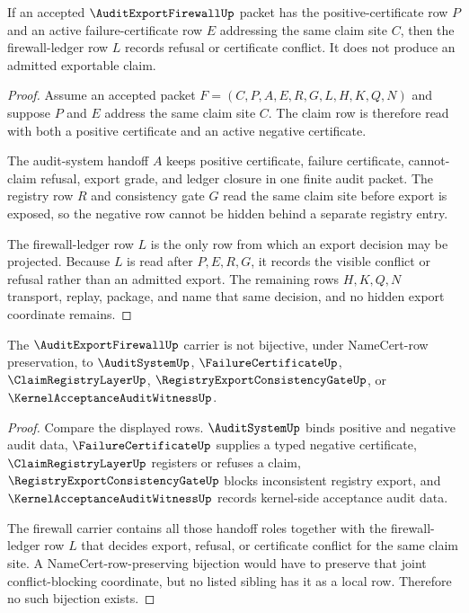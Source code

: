 \begin{theorem}
\label{thm:audit-export-firewall-nonescape}
If an accepted $\AuditExportFirewallUp$ packet has the positive-certificate row $P$ and an active failure-certificate row $E$ addressing the same claim site $C$, then the firewall-ledger row $L$ records refusal or certificate conflict. It does not produce an admitted exportable claim.
\end{theorem}
\begin{proof}
Assume an accepted packet $F=(C,P,A,E,R,G,L,H,K,Q,N)$ and suppose $P$ and $E$ address the same claim site $C$. The claim row is therefore read with both a positive certificate and an active negative certificate.

The audit-system handoff $A$ keeps positive certificate, failure certificate, cannot-claim refusal, export grade, and ledger closure in one finite audit packet. The registry row $R$ and consistency gate $G$ read the same claim site before export is exposed, so the negative row cannot be hidden behind a separate registry entry.

The firewall-ledger row $L$ is the only row from which an export decision may be projected. Because $L$ is read after $P,E,R,G$, it records the visible conflict or refusal rather than an admitted export. The remaining rows $H,K,Q,N$ transport, replay, package, and name that same decision, and no hidden export coordinate remains.
\end{proof}

\begin{theorem}
\label{thm:audit-export-firewall-sibling-independence}
The $\AuditExportFirewallUp$ carrier is not bijective, under NameCert-row preservation, to $\AuditSystemUp$, $\FailureCertificateUp$, $\ClaimRegistryLayerUp$, $\RegistryExportConsistencyGateUp$, or $\KernelAcceptanceAuditWitnessUp$.
\end{theorem}
\begin{proof}
Compare the displayed rows. $\AuditSystemUp$ binds positive and negative audit data, $\FailureCertificateUp$ supplies a typed negative certificate, $\ClaimRegistryLayerUp$ registers or refuses a claim, $\RegistryExportConsistencyGateUp$ blocks inconsistent registry export, and $\KernelAcceptanceAuditWitnessUp$ records kernel-side acceptance audit data.

The firewall carrier contains all those handoff roles together with the firewall-ledger row $L$ that decides export, refusal, or certificate conflict for the same claim site. A NameCert-row-preserving bijection would have to preserve that joint conflict-blocking coordinate, but no listed sibling has it as a local row. Therefore no such bijection exists.
\end{proof}

